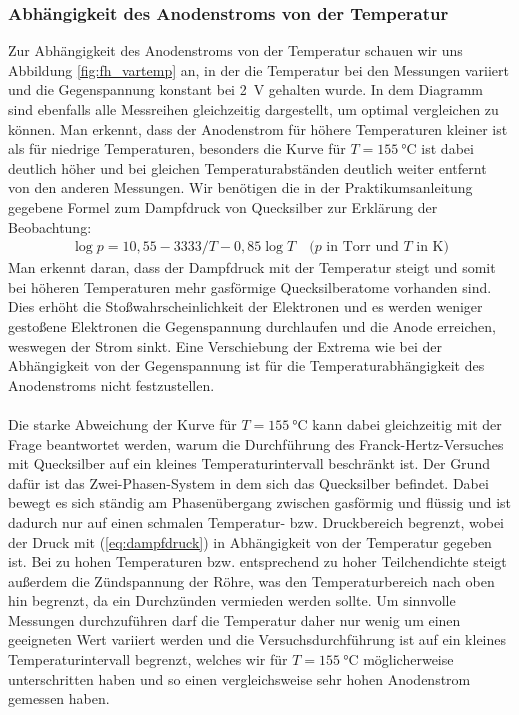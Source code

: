 \documentclass[11pt, a4paper]{article}
\begin{document}
\subsubsection{Abhängigkeit des Anodenstroms von der Temperatur}
Zur Abhängigkeit des Anodenstroms von der Temperatur schauen wir uns Abbildung \ref{fig:fh_vartemp} an, in der die Temperatur bei den Messungen variiert und die Gegenspannung konstant bei \SI{2}{\volt} gehalten wurde.
In dem Diagramm sind ebenfalls alle Messreihen gleichzeitig dargestellt, um optimal vergleichen zu können.
Man erkennt, dass der Anodenstrom für höhere Temperaturen kleiner ist als für niedrige Temperaturen, besonders die Kurve für $T=\SI{155}{\degreeCelsius}$ ist dabei deutlich höher und bei gleichen Temperaturabständen deutlich weiter entfernt von den anderen Messungen.
Wir benötigen die in der Praktikumsanleitung gegebene Formel zum Dampfdruck von Quecksilber zur Erklärung der Beobachtung:
\begin{align}
\log p = 10,55-3333/T-0,85\log T \quad \text{($p$ in Torr und $T$ in K)}
\label{eq:dampfdruck}
\end{align}
Man erkennt daran, dass der Dampfdruck mit der Temperatur steigt und somit bei höheren Temperaturen mehr gasförmige Quecksilberatome vorhanden sind.
Dies erhöht die Stoßwahrscheinlichkeit der Elektronen und es werden weniger gestoßene Elektronen die Gegenspannung durchlaufen und die Anode erreichen, weswegen der Strom sinkt.
Eine Verschiebung der Extrema wie bei der Abhängigkeit von der Gegenspannung ist für die Temperaturabhängigkeit des Anodenstroms nicht festzustellen.
\\
\\
Die starke Abweichung der Kurve für $T=\SI{155}{\degreeCelsius}$ kann dabei gleichzeitig mit der Frage beantwortet werden, warum die Durchführung des Franck-Hertz-Versuches mit Quecksilber auf ein kleines Temperaturintervall beschränkt ist.
Der Grund dafür ist das Zwei-Phasen-System in dem sich das Quecksilber befindet.
Dabei bewegt es sich ständig am Phasenübergang zwischen gasförmig und flüssig und ist dadurch nur auf einen schmalen Temperatur- bzw. Druckbereich begrenzt, wobei der Druck mit (\ref{eq:dampfdruck}) in Abhängigkeit von der Temperatur gegeben ist.
Bei zu hohen Temperaturen bzw. entsprechend zu hoher Teilchendichte steigt außerdem die Zündspannung der Röhre, was den Temperaturbereich nach oben hin begrenzt, da ein Durchzünden vermieden werden sollte. 
Um sinnvolle Messungen durchzuführen darf die Temperatur daher nur wenig um einen geeigneten Wert variiert werden und die Versuchsdurchführung ist auf ein kleines Temperaturintervall begrenzt, welches wir für $T=\SI{155}{\degreeCelsius}$ möglicherweise unterschritten haben und so einen vergleichsweise sehr hohen Anodenstrom gemessen haben.
\end{document}

